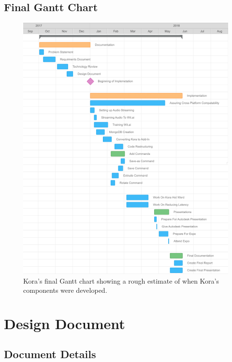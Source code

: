 \documentclass[onecolumn, draftclsnofoot,10pt, compsoc]{IEEEtran}
\begin{document}
	\subsection{Final Gantt Chart}
		\begin{figure}[H]
			\includegraphics[width=16cm]{finalGantt}
			\centering
			\caption{Kora's final Gantt chart showing a rough estimate of when Kora's components were developed.}
		\end{figure}


















\section{Design Document}
	\subsection{Document Details}
\end{document}
